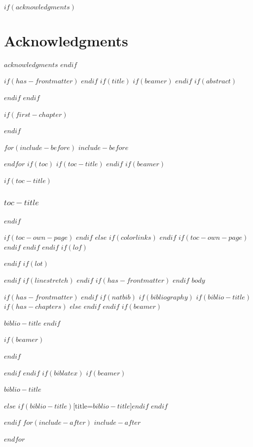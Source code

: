 \documentclass[
$if(fontsize)$
  $fontsize$,
$endif$
$if(papersize)$
  $papersize$paper,
$else$
  paper=a4,
$endif$
$if(beamer)$
  ignorenonframetext,
$if(handout)$
  handout,
$endif$
$if(aspectratio)$
  aspectratio=$aspectratio$,
$endif$

$if(babel-lang)$
  $babel-lang$,
$endif$

$endif$
$for(classoption)$
  $classoption$$sep$,
$endfor$
  ,captions=tableheading
]{$if(beamer)$$documentclass$$else$$if(book)$scrbook$else$scrartcl$endif$$endif$}
\newif\ifbibliography
\begin{document}

$if(acknowledgments)$
\newpage
\thispagestyle{empty}
\section*{Acknowledgments}
\begingroup
$acknowledgments$
\endgroup
\newpage
$endif$

$if(has-frontmatter)$
\frontmatter
$endif$
$if(title)$
$if(beamer)$
\frame{\titlepage}
$endif$
$if(abstract)$
\begin{abstract}
$abstract$
\end{abstract}
$endif$
$endif$

$if(first-chapter)$
\setcounter{chapter}{$first-chapter$}
\addtocounter{chapter}{-1}
$endif$

$for(include-before)$
$include-before$

$endfor$
$if(toc)$
$if(toc-title)$
\renewcommand*\contentsname{$toc-title$}
$endif$
$if(beamer)$
\begin{frame}[allowframebreaks]
$if(toc-title)$
  \frametitle{$toc-title$}
$endif$
  \tableofcontents[hideallsubsections]
\end{frame}
$if(toc-own-page)$
\newpage
$endif$
$else$
{
$if(colorlinks)$
\hypersetup{linkcolor=$if(toccolor)$$toccolor$$else$$endif$}
$endif$
\setcounter{tocdepth}{$toc-depth$}
\tableofcontents
$if(toc-own-page)$
\newpage
$endif$
}
$endif$
$endif$
$if(lof)$
\listoffigures
$endif$
$if(lot)$
\listoftables
$endif$
$if(linestretch)$
$endif$
$if(has-frontmatter)$
\mainmatter
$endif$
$body$

$if(has-frontmatter)$
\backmatter
$endif$
$if(natbib)$
$if(bibliography)$
$if(biblio-title)$
$if(has-chapters)$
\renewcommand\bibname{$biblio-title$}
$else$
\renewcommand\refname{$biblio-title$}
$endif$
$endif$
$if(beamer)$
\begin{frame}[allowframebreaks]{$biblio-title$}
  \bibliographytrue
$endif$
  
$if(beamer)$
\end{frame}
$endif$

$endif$
$endif$
$if(biblatex)$
$if(beamer)$
\begin{frame}[allowframebreaks]{$biblio-title$}
  \bibliographytrue
  \printbibliography[heading=none]
\end{frame}
$else$
\printbibliography$if(biblio-title)$[title=$biblio-title$]$endif$
$endif$

$endif$
$for(include-after)$
$include-after$

$endfor$
\end{document}
